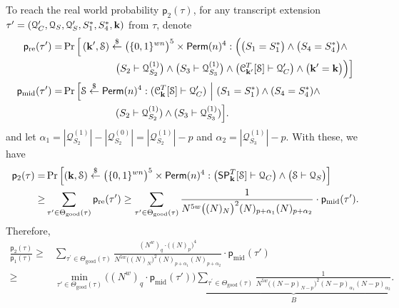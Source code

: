 To reach the real world probability $\mathsf{p}_2(\tau)$, for any transcript extension $\tau'=(\mathcal{Q}_{C}',\mathcal{Q}_{S},\mathcal{Q}_{S}',S_1^*,S_4^*,\mathbf{k})$ from $\tau$, denote
%
%
\begin{align}
\mathsf{p}_{\mathrm{re}}(\tau') = & \operatorname{Pr}\Big[\left(\mathbf{k}',\mathcal{S}\right) \stackrel{\$}{\leftarrow} \big(\{0,1\}^{wn}\big)^5 \times \mathsf{Perm}(n)^4:
\Big(\big(S_1=S_1^*\big)\wedge\big(S_4=S_4^*\big)\wedge		\notag 	\\
&\ \ \ \ \ \ \ \ \ \ \ \ \ \ \ \ \big(S_2\vdash\mathcal{Q}_{S_2}^{(1)}\big)\wedge\big(S_3\vdash\mathcal{Q}_{S_3}^{(1)}\big)\wedge\big(\mathcal{C}_{\mathbf{k}'}^T[\mathcal{S}] \vdash \mathcal{Q}_C'\big)\wedge\big(\mathbf{k}'=\mathbf{k}\big)\Big)\Big]	 	\notag 	\\
\mathsf{p}_{\mathrm{mid}}(\tau') = & \operatorname{Pr}\Big[\mathcal{S} \stackrel{\$}{\leftarrow}\mathsf{Perm}(n)^4:(\mathcal{C}_{\mathbf{k}}^T[\mathcal{S}] \vdash \mathcal{Q}_C')~\Big|~
(S_1=S_1^*)\wedge (S_4=S_4^*)\wedge	 	\notag 	\\
&\ \ \ \ \ \ \ \ \ \ \ \ \ \ \ \  (S_2\vdash\mathcal{Q}_{S_2}^{(1)})\wedge (S_3\vdash\mathcal{Q}_{S_3}^{(1)})\Big].	 	\notag 	
\end{align}
%
%
%
and let $\alpha_1=|\mathcal{Q}_{S_2}^{(1)}|-|\mathcal{Q}_{S_2}^{(0)}|=|\mathcal{Q}_{S_2}^{(1)}|-p$ and $\alpha_2=|\mathcal{Q}_{S_3}^{(1)}|-p$. With these, we have
%
%
\begin{align*}
\mathsf{p}_2(\tau)=&\operatorname{Pr}\left[\left(\mathbf{k},\mathcal{S}\right) \stackrel{\$}{\leftarrow} \big(\{0,1\}^{wn}\big)^5 \times \mathsf{Perm}(n)^4:\big(\spn_{\bfk}^{T}[\mathcal{S}] \vdash \mathcal{Q}_{C}\big) \wedge \big(\mathcal{S} \vdash \mathcal{Q}_{S}\big)\right]		\\
\geq & \sum_{\tau^{\prime} \in \Theta_{\mathrm{good}}(\tau)} \mathsf{p}_{\mathrm{re}}(\tau')  
\geq
\sum_{\tau^{\prime} \in \Theta_{\mathrm{good}}(\tau)}
%
\frac{1}{N^{5w}\big((N)_{N}\big)^2(N)_{p+\alpha_1}(N)_{p+\alpha_2}}\cdot \mathsf{p}_{\mathrm{mid}}(\tau')  .
\end{align*}
%
%
Therefore,
%
%
\begin{align*}
\frac{\mathsf{p}_{2}(\tau)}{\mathsf{p}_{1}(\tau)}   \geq  &
\sum_{\tau^{\prime} \in \Theta_{\mathrm{good}}(\tau)}
\frac{(N^w)_q\cdot\big((N)_p\big)^4}{N^{5w}\big((N)_{N}\big)^2(N)_{p+\alpha_1}(N)_{p+\alpha_2}}\cdot \mathsf{p}_{\mathrm{mid}}(\tau')         \\
\geq  &    \min_{\tau' \in \Theta_{\mathrm{good}}(\tau)}\big((N^w)_q\cdot\mathsf{p}_{\mathrm{mid}}(\tau')\big)
\underbrace{\sum_{\tau^{\prime} \in \Theta_{\mathrm{good}}(\tau)}
\frac{1}{N^{5w}\big((N-p)_{N-p}\big)^2(N-p)_{\alpha_1}(N-p)_{\alpha_2}}}_{B} .
\end{align*}



